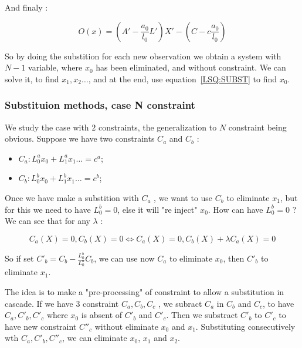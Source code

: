 And finaly :

\begin{equation}
    O(x) = (A'- \frac{a_0}{l_0} L') X'  - (C -c\frac{a_0}{l_0})
\end{equation}

So by doing the substition for each new observation we obtain a system with $N-1$ variable,
where $x_0$ has been eliminated, and without constraint. We can solve it, to find $x_1, x_2 \dots $,
and at the end, use equation~\ref{LSQ:SUBST} to find $x_0$.



\subsubsection{Substituion methods, case N constraint}

We study the case with $2$ constraints, the generalization to $N$ constraint being obvious.
Suppose we have two constraints $C_a$ and $C_b$ :

\begin{itemize}
    \item $C_a : L^a_0 x_0 +  L^a_1 x_1 \dots    = c^a$;
    \item $C_b : L^b_0 x_0 +  L^b_1 x_1 \dots    = c^b$;
\end{itemize}

Once we have make a substition with $C_a$ , we  want to use $C_b$ to eliminate $x_1$,
but for this we need to have $ L^b_0=0$, else it will "re inject" $x_0$.  How can
have $L^b_0=0$ ?  We can see that for any $\lambda$ :

\begin{equation}
    C_a(X)=0  , C_b(X)=0   \Leftrightarrow  C_a(X)=0  , C_b(X)+\lambda C_a(X) =0
\end{equation}

So if set $C'_b = C_b - \frac{L^b_0}{L^a_0} C_b$, we can use now $C_a$ to eliminate $x_0$,
then $C'_b$ to eliminate $x_1$. 

The idea is to make a "pre-processing" of constraint to allow a substitution in cascade.
If we have $3$ constraint $C_a,C_b,C_c$ , we subract $C_a$ in $C_b$ and $C_c$, to have $C_a,C'_b,C'_c$
where $x_0$ is absent of $C'_b$ and $C'_c$. Then we substract  $C'_b$ to $C'_c$ to have new constraint 
$C''_c$ without eliminate $x_0$ and $x_1$.  Substituting consecutively wth $C_a,C'_b,C''_c$, we can eliminate
$x_0$, $x_1$ and $x_2$.

